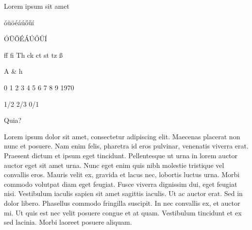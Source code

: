 \documentclass[a4paper, twoside, 12p]{memoir}
\begin{document}
	Lorem ipsum sit amet

	óüöéáúőűí

	ÓÜÖÉÁÚŐŰÍ

	ff fi Th ck ct st  tz ß

	A \& h

	0 1 2 3 4 5 6 7 8 9  1970

	1/2 2/3 0/1

	Quia?

	Lorem ipsum dolor sit amet, consectetur adipiscing elit. Maecenas placerat non nunc et posuere. Nam enim felis, pharetra id eros pulvinar, venenatis viverra erat. Praesent dictum et ipsum eget tincidunt. Pellentesque ut urna in lorem auctor auctor eget sit amet  urna. Nunc eget enim quis nibh molestie tristique vel convallis eros. Mauris velit ex, gravida et lacus nec, lobortis luctus urna. Morbi commodo volutpat diam eget feugiat. Fusce viverra dignissim dui, eget feugiat nisi. Vestibulum iaculis sapien sit amet sagittis iaculis. Ut ac auctor erat. Sed in dolor libero. Phasellus commodo fringilla suscipit. In nec convallis ex, et auctor mi. Ut quis est nec velit posuere congue et at quam. Vestibulum tincidunt et ex sed lacinia. Morbi laoreet posuere aliquam.
\end{document}
